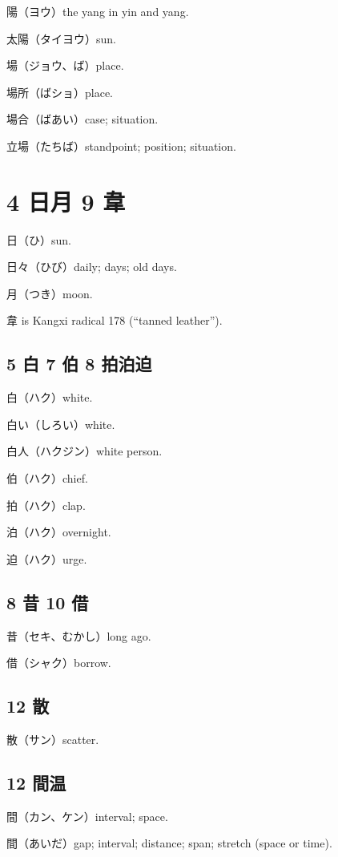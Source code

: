 陽（ヨウ）the yang in yin and yang.

太陽（タイヨウ）sun.

場（ジョウ、ば）place.

場所（ばショ）place.

場合（ばあい）case; situation.

立場（たちば）standpoint; position; situation.

\section{4 日月 9 韋}

日（ひ）sun.

日々（ひび）daily; days; old days.

月（つき）moon.

韋 is Kangxi radical 178 (``tanned leather'').

\subsection{5 白 7 伯 8 拍泊迫}

白（ハク）white.

白い（しろい）white.

白人（ハクジン）white person.

伯（ハク）chief.

拍（ハク）clap.

泊（ハク）overnight.

迫（ハク）urge.

\subsection{8 昔 10 借}

昔（セキ、むかし）long ago.

借（シャク）borrow.

\subsection{12 散}

散（サン）scatter.

\subsection{12 間温}

間（カン、ケン）interval; space.

間（あいだ）gap; interval; distance; span; stretch (space or time).

